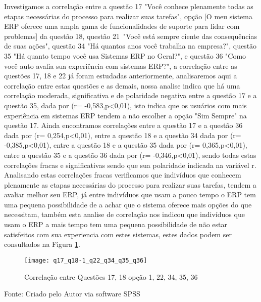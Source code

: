 Investigamos a correlação entre a questão 17 "Você conhece plenamente todas as etapas necessárias do processo para realizar suas tarefas", opção [O meu sistema ERP oferece uma ampla gama de funcionalidades de suporte para lidar com problemas] da questão 18, questão 21 "Você está sempre ciente das consequências de suas ações", questão 34 "Há quantos anos você trabalha na empresa?", questão 35 "Há quanto tempo você usa Sistemas ERP no Geral?", e questão 36 "Como você auto avalia sua experiência com sistemas ERP?", a correlação entre as questões 17, 18 e 22 já  foram estudadas anteriormente, analisaremos aqui a correlação entre estas questões e as demais, nossa analise indica que há uma correlação moderada, significativa e de polaridade negativa entre a questão 17 e a questão 35, dada por (r= -0,583,p<0,01), isto indica que os  usuários com mais experiência em sistemas ERP tendem a não escolher a opção "Sim Sempre" na questão 17.\newline
\indent Ainda encontramos correlações entre a questão 17 e a questão 36 dada por (r= 0,254,p<0,01), entre a questão 18 e a questão 34 dada por (r= -0,385,p<0,01), entre a questão 18 e a questão 35 dada por (r= 0,365,p<0,01), entre a questão 35 e a questão 36 dada por (r= -0,346,p<0,01), sendo todas estas correlações fracas e significativas sendo que sua polaridade indicada na variável r.\newline
\indent Analisando estas  correlações  fracas verificamos que indivíduos que conhecem plenamente as etapas necessárias do processo para realizar suas tarefas,  tendem  a avaliar melhor seu ERP, já entre indivíduos que usam a pouco tempo o ERP tem uma pequena possibilidade de a achar que o sistema oferece mais opções do que  necessitam,  também esta analise de correlação nos indicou que indivíduos que usam o ERP a mais tempo tem uma pequena possibilidade de não estar satisfeitos com sua experiencia com estes sistemas, estes dados podem ser consultados na Figura  \ref{fig:figura-q17_q18-1_q22_q34_q35_q36}.

\begin{figure}[H]
	\centering	
	\caption{Correlação entre Questões 17, 18 opção 1, 22, 34, 35, 36}
	\texttt{[image: q17\_q18-1\_q22\_q34\_q35\_q36]}
	\label{fig:figura-q17_q18-1_q22_q34_q35_q36}
\end{figure}
\vspace{-0.8 cm} \hspace{0.85 cm} Fonte: Criado pelo Autor via software SPSS\newline

